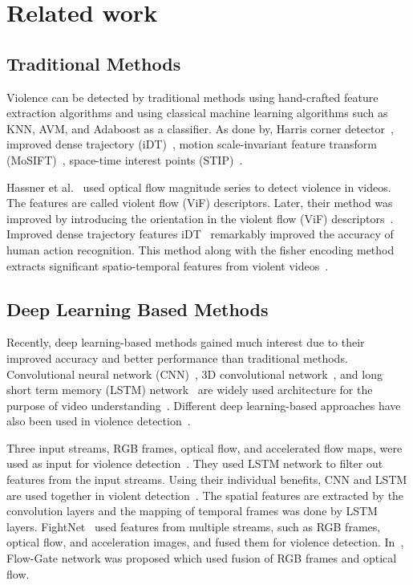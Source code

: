 \section{Related work}
    \label{sec:relatedwork}
    \subsection{Traditional Methods}
    
    Violence can be detected by traditional methods using hand-crafted feature extraction algorithms and using classical machine learning algorithms such as KNN, AVM, and Adaboost as a classifier. 
    As done by, Harris corner detector~\cite{chen2008recognition}, improved dense trajectory (iDT)~\cite{wang2013action_9}, motion scale-invariant feature transform (MoSIFT)~\cite{xu2014violent_22}, space-time interest points (STIP)~\cite{de2010violence_7}.
    
    Hassner et al.~\cite{hassner2012violent_6} used optical flow magnitude series to detect violence in videos. The features are called violent flow (ViF) descriptors.
    Later, their method was improved by introducing the orientation in the violent flow (ViF) descriptors~\cite{gao2016violence_23}.
    Improved dense trajectory features iDT~\cite{wang2013action_9} remarkably improved the accuracy of human action recognition. 
    This method along with the fisher encoding method extracts significant spatio-temporal features from violent videos~\cite{bilinski2016human_24}.
    
    \subsection{Deep Learning Based Methods}
    Recently, deep learning-based methods gained much interest due to their improved accuracy and better performance than traditional methods. 
    Convolutional neural network (CNN)~\cite{lecun1995convolutional}, 3D convolutional network~\cite{ji_3dconv},  and long short term memory (LSTM) network~\cite{10.1162/neco.1997.9.8.1735} are widely used architecture for the purpose of video understanding~\cite{11convlstm_donahue2015long, c3dtran2015learning, i3dcarreira2017quo}.
    Different deep learning-based approaches have also been used in violence detection~\cite{26_zhou2017violent, 29_sudhakaran2017learning}. 
    	
	Three input streams, RGB frames, optical flow, and accelerated flow maps, were used as input for violence detection~\cite{28_dong2016multi}.
	They used LSTM network to filter out features from the input streams. 
	Using their individual benefits, CNN and LSTM are used together in violent detection~\cite{30_shi2015convolutional,29_sudhakaran2017learning}. 
	The spatial features are extracted by the convolution layers and the mapping of temporal frames was done by LSTM layers.
	FightNet~\cite{26_zhou2017violent} used features from multiple streams, such as RGB frames, optical flow, and acceleration images, and fused them for violence detection. In~\cite{cheng2019rwf}, Flow-Gate network was proposed which used fusion of RGB frames and optical flow.